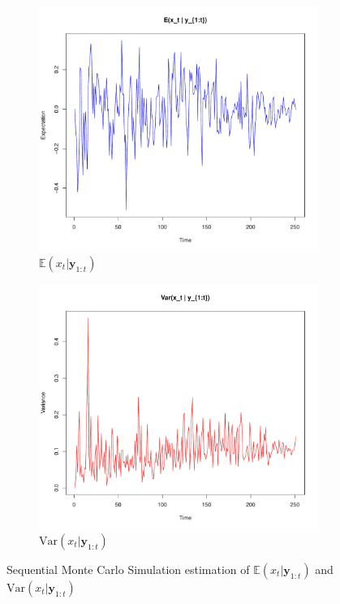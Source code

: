 \begin{figure}[H]
    \centering
    \begin{subfigure}[b]{0.45\textwidth}
        \centering
        \includegraphics[width=\textwidth]{Images/Exercise_2_Figures/SMC_2a.pdf} 
        \caption{$\mathbb{E}(x_t | \boldsymbol{y}_{1:t})$}
        \label{fig:sub1}
    \end{subfigure}
    \hfill
    \begin{subfigure}[b]{0.45\textwidth}
        \centering
        \includegraphics[width=\textwidth]{Images/Exercise_2_Figures/SMC_2b.pdf} 
        \caption{$\text{Var}(x_t | \boldsymbol{y}_{1:t})$}
        \label{fig:sub2}
    \end{subfigure}
    \caption{Sequential Monte Carlo Simulation estimation of $\mathbb{E}(x_t | \boldsymbol{y}_{1:t})$ and $\text{Var}(x_t | \boldsymbol{y}_{1:t})$}
    \label{fig:overall}
\end{figure}
